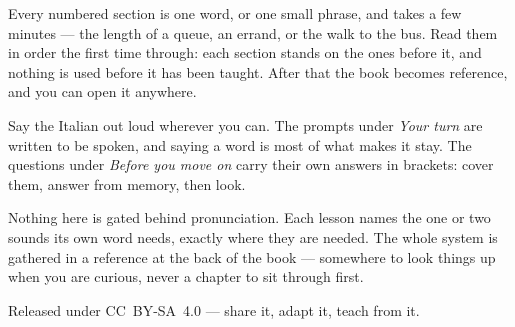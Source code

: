 \documentclass[11pt,twoside]{book}
\begin{document}
Every numbered section is one word, or one small phrase, and takes a few
minutes --- the length of a queue, an errand, or the walk to the bus. Read them
in order the first time through: each section stands on the ones before it, and
nothing is used before it has been taught. After that the book becomes
reference, and you can open it anywhere.

Say the Italian out loud wherever you can. The prompts under \emph{Your turn}
are written to be spoken, and saying a word is most of what makes it stay. The
questions under \emph{Before you move on} carry their own answers in brackets:
cover them, answer from memory, then look.

Nothing here is gated behind pronunciation. Each lesson names the one or two
sounds its own word needs, exactly where they are needed. The whole system is
gathered in a reference at the back of the book --- somewhere to look things up
when you are curious, never a chapter to sit through first.

Released under CC~BY-SA~4.0 --- share it, adapt it, teach from it.

\tableofcontents

\mainmatter





























\backmatter






\end{document}
